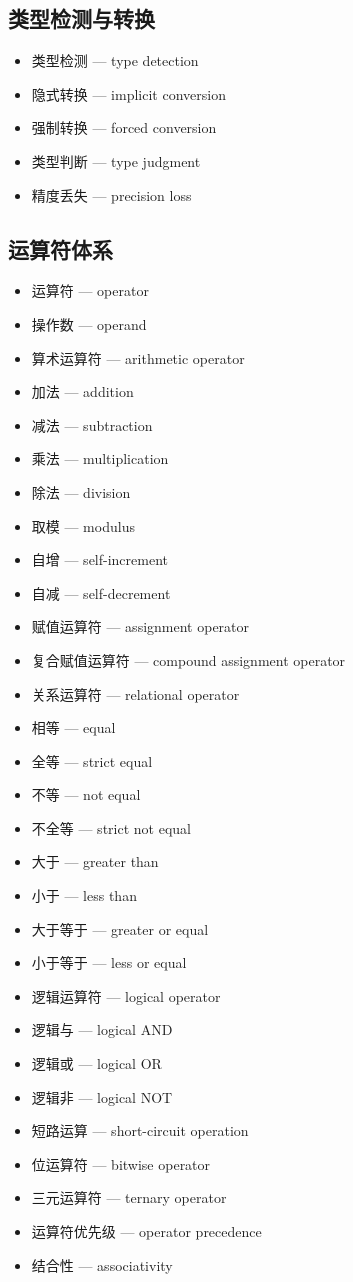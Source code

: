 \subsection{类型检测与转换}
\begin{itemize}
\item 类型检测 — type detection
\item 隐式转换 — implicit conversion
\item 强制转换 — forced conversion
\item 类型判断 — type judgment
\item 精度丢失 — precision loss
\end{itemize}

\subsection{运算符体系}
\begin{itemize}
\item 运算符 — operator
\item 操作数 — operand
\item 算术运算符 — arithmetic operator
\item 加法 — addition
\item 减法 — subtraction
\item 乘法 — multiplication
\item 除法 — division
\item 取模 — modulus
\item 自增 — self-increment
\item 自减 — self-decrement
\item 赋值运算符 — assignment operator
\item 复合赋值运算符 — compound assignment operator
\item 关系运算符 — relational operator
\item 相等 — equal
\item 全等 — strict equal
\item 不等 — not equal
\item 不全等 — strict not equal
\item 大于 — greater than
\item 小于 — less than
\item 大于等于 — greater or equal
\item 小于等于 — less or equal
\item 逻辑运算符 — logical operator
\item 逻辑与 — logical AND
\item 逻辑或 — logical OR
\item 逻辑非 — logical NOT
\item 短路运算 — short-circuit operation
\item 位运算符 — bitwise operator
\item 三元运算符 — ternary operator
\item 运算符优先级 — operator precedence
\item 结合性 — associativity
\end{itemize}

